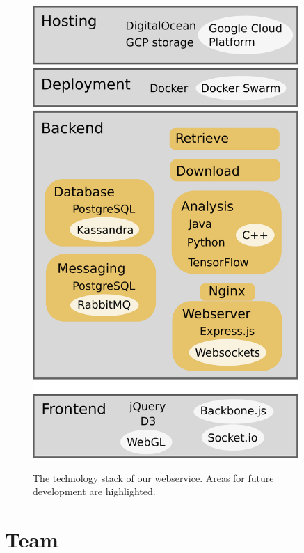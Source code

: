 \documentclass[12pt]{article} %
\let\oldsection\section
\renewcommand\section{\clearpage\oldsection}
\begin{document}
\begin{figure}[h]
                \centering
                \includegraphics[width=0.9\textwidth,height=0.9\textheight,keepaspectratio]{img/diagram.pdf}
           \label{fig:tech-diagram}
           \caption{The technology stack of our webservice. Areas for future development are highlighted.}
\end{figure}

\section{Team}
\end{document}

